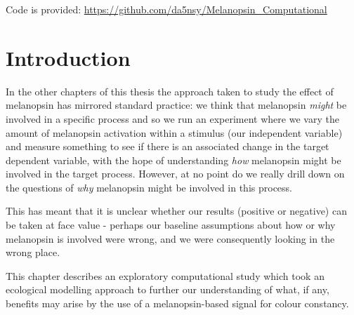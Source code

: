 

Code is provided: \url{https://github.com/da5nsy/Melanopsin_Computational}

\section{Introduction}

In the other chapters of this thesis the approach taken to study the effect of melanopsin has mirrored standard practice: we think that melanopsin \emph{might} be involved in a specific process and so we run an experiment where we vary the amount of melanopsin activation within a stimulus (our independent variable) and measure something to see if there is an associated change in the target dependent variable, with the hope of understanding \emph{how} melanopsin might be involved in the target process. However, at no point do we really drill down on the questions of \emph{why} melanopsin might be involved in this process.

This has meant that it is unclear whether our results (positive or negative) can be taken at face value - perhaps our baseline assumptions about how or why melanopsin is involved were wrong, and we were consequently looking in the wrong place.

This chapter describes an exploratory computational study which took an ecological modelling approach to further our understanding of what, if any, benefits may arise by the use of a melanopsin-based signal for colour constancy.

